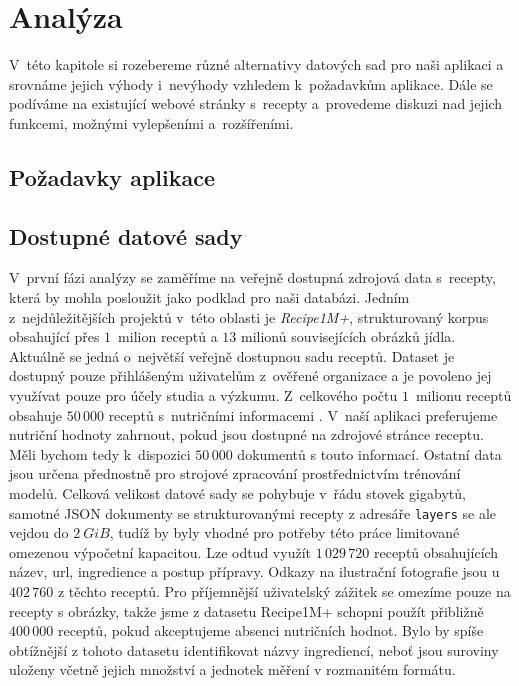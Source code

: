
\chapter{Analýza}

V~této kapitole si rozebereme různé alternativy datových sad pro naši aplikaci a srovnáme jejich výhody i~nevýhody vzhledem k~požadavkům aplikace. Dále se podíváme na existující webové stránky s~recepty a~provedeme diskuzi nad jejich funkcemi, možnými vylepšeními a~rozšířeními.

\section{Požadavky aplikace}

\section{Dostupné datové sady}

V~první fázi analýzy se zaměříme na veřejně dostupná zdrojová data s~recepty, která by mohla posloužit jako podklad pro naši databázi. Jedním z~nejdůležitějších projektů v~této oblasti je \emph{Recipe1M+}, strukturovaný korpus obsahující přes $1$~milion receptů a $13$ milionů souvisejících obrázků jídla. Aktuálně se jedná o~největší veřejně dostupnou sadu receptů. Dataset je dostupný pouze přihlášeným uživatelům z~ověřené organizace a je povoleno jej využívat pouze pro účely studia a výzkumu. Z~celkového počtu $1$~milionu receptů obsahuje $50\,000$ receptů s~nutričními informacemi \citep{marin2019learning}. V~naší aplikaci preferujeme nutriční hodnoty zahrnout, pokud jsou dostupné na zdrojové stránce receptu. Měli bychom tedy k~dispozici $50\,000$ dokumentů s touto informací. Ostatní data jsou určena přednostně pro strojové zpracování prostřednictvím trénování modelů. Celková velikost datové sady se pohybuje v~řádu stovek gigabytů, samotné JSON dokumenty se strukturovanými recepty z adresáře \texttt{layers} se ale vejdou do $2~GiB$, tudíž by byly vhodné pro potřeby této práce limitované omezenou výpočetní kapacitou. Lze odtud využít $1\,029\,720$ receptů obsahujících název, url, ingredience a postup přípravy. Odkazy na ilustrační fotografie jsou u $402\,760$ z těchto receptů. Pro příjemnější uživatelský zážitek se omezíme pouze na recepty s obrázky, takže jsme z datasetu Recipe1M+ schopni použít přibližně $400\,000$ receptů, pokud akceptujeme absenci nutričních hodnot. Bylo by spíše obtížnější z tohoto datasetu identifikovat názvy ingrediencí, neboť jsou suroviny uloženy včetně jejich množství a jednotek měření v rozmanitém formátu.

